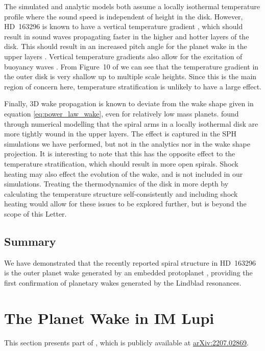The simulated and analytic models both assume a locally isothermal temperature profile where the sound speed is independent of height in the disk.
However, HD~163296 is known to have a vertical temperature gradient \citep{rosenfeld2013,degregorio-monsalvo2013}, which should result in sound waves propagating faster in the higher and hotter layers of the disk.
This should result in an increased pitch angle for the planet wake in the upper layers \citep{juhasz2018}.
Vertical temperature gradients also allow for the excitation of buoyancy waves \citep{bae2021}.
From Figure~10 of \citet{law2021} we can see that the temperature gradient in the outer disk is very shallow up to multiple scale heights. 
Since this is the main region of concern here, temperature stratification is unlikely to have a large effect.

Finally, 3D wake propagation is known to deviate from the wake shape given in equation \ref{eq:power_law_wake}, even for relatively low mass planets.
\citet{zhu2015} found through numerical modelling that the spiral arms in a locally isothermal disk are more tightly wound in the upper layers.
The effect is captured in the SPH simulations we have performed, but not in the analytics nor in the wake shape projection.
It is interesting to note that this has the opposite effect to the temperature stratification, which should result in more open spirals.
Shock heating may also effect the evolution of the wake, and is not included in our simulations.
Treating the thermodynamics of the disk in more depth by calculating the temperature structure self-consistently and including shock heating would allow for these issues to be explored further, but is beyond the scope of this Letter.

\subsection{Summary}

We have demonstrated that the recently reported spiral structure in HD~163296 \citep{teague2021} is the outer planet wake generated by an embedded protoplanet \citep{pinte2018a}, providing the first confirmation of planetary wakes generated by the Lindblad resonances.

\section{The Planet Wake in IM Lupi} \label{sec:IMLupiwake}

This section presents part of \citet{verrios2022}, which is publicly available at \href{https://arxiv.org/abs/2207.02869}{\url{arXiv:2207.02869}}.

